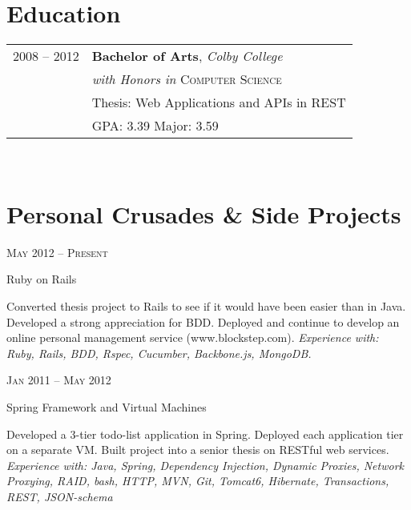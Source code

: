 \documentclass[10pt]{article} %
\begin{document}
{\begin{minipage}[t]{0.44\textwidth}

\section{Education} 


\begin{tabular}{rl} %


2008 -- \textsc{2012} & \textbf{Bachelor of Arts}, \textit{Colby College}\\ 
											& \textit{with Honors in} \textsc{Computer Science} \\
											& \footnotesize Thesis: Web Applications and APIs in REST \\
											& \small{GPA: 3.39} \small{Major: 3.59} \\
\end{tabular}\\[10pt]

\section{Personal Crusades \& Side Projects} 


{\raggedleft\textsc{May 2012 -- Present}\par}
{\raggedright\large Ruby on Rails}
{\normalsize{ Converted thesis project to Rails to see if it would have been easier than in Java. Developed a strong appreciation for BDD. Deployed and continue to develop an online personal management service (www.blockstep.com).}
\textit{Experience with: Ruby, Rails, BDD, Rspec, Cucumber, Backbone.js, MongoDB. }}


{\raggedleft\textsc{Jan 2011 -- May 2012}\par}
{\raggedright\large Spring Framework and Virtual Machines }
{\normalsize{ Developed a 3-tier todo-list application in Spring. Deployed each application tier on a separate VM. Built project into a senior thesis on RESTful web services. }
\textit{Experience with: Java, Spring, Dependency Injection, Dynamic Proxies, Network Proxying, RAID, bash, HTTP, MVN, Git, Tomcat6, Hibernate, Transactions, REST, JSON-schema } }


\end{minipage}}
\end{document}
